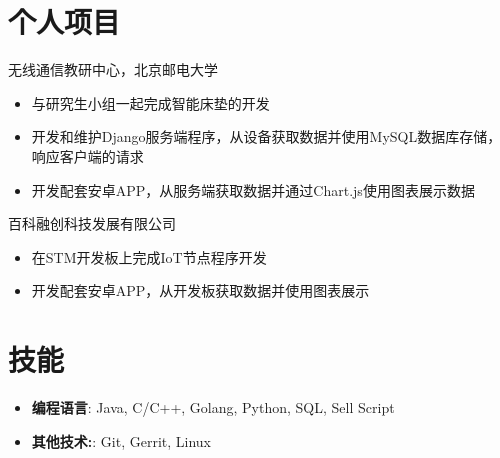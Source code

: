 \documentclass{resume}
\begin{document}
\section{个人项目}
无线通信教研中心，北京邮电大学
\begin{itemize}[parsep=0.25ex]
    \item 与研究生小组一起完成智能床垫的开发
    \item 开发和维护Django服务端程序，从设备获取数据并使用MySQL数据库存储，响应客户端的请求
    \item 开发配套安卓APP，从服务端获取数据并通过Chart.js使用图表展示数据
\end{itemize}
百科融创科技发展有限公司
\begin{itemize}[parsep=0.25ex]
    \item 在STM开发板上完成IoT节点程序开发
    \item 开发配套安卓APP，从开发板获取数据并使用图表展示
\end{itemize}

\vspace{6pt}

\section{技能}
\begin{itemize}[parsep=0.25ex]
    \item
          \textbf{编程语言}:
          Java, C/C++, Golang, Python, SQL, Sell Script
    \item
          \textbf{其他技术:}:
          Git, Gerrit, Linux
\end{itemize}
\end{document}
